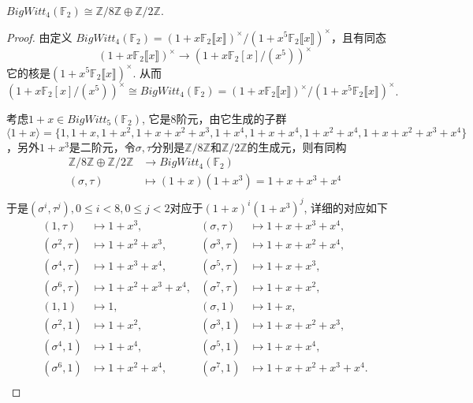 \begin{example}
	$BigWitt_4(\mathbb{F}_2) \cong \mathbb{Z}/8 \mathbb{Z} \oplus \mathbb{Z}/2 \mathbb{Z}.$
\end{example}
\begin{proof}
由定义
$BigWitt_4(\mathbb{F}_2)=(1+x \mathbb{F}_2\llbracket x\rrbracket )^{\times}/(1+x^5 \mathbb{F}_2\llbracket x\rrbracket )^{\times}$，且有同态
\[(1+x \mathbb{F}_2\llbracket x\rrbracket )^{\times} \longrightarrow (1+x \mathbb{F}_2[x]/(x^5))^{\times}\]
它的核是$(1+x^5 \mathbb{F}_2\llbracket x\rrbracket )^{\times}$.
从而$(1+x \mathbb{F}_2[x]/(x^5))^{\times} \cong BigWitt_4(\mathbb{F}_2)=(1+x \mathbb{F}_2\llbracket x\rrbracket )^{\times}/(1+x^5 \mathbb{F}_2\llbracket x\rrbracket )^{\times}$.

	考虑$1+x \in BigWitt_5(\mathbb{F}_2)$, 它是$8$阶元，由它生成的子群$\langle 1+x \rangle = \{1,1+x,1+x^2,1+x+x^2+x^3,1+x^4,1+x+x^4,1+x^2+x^4,1+x+x^2+x^3+x^4\}$，另外$1+x^3$是二阶元，令$\sigma,\tau$分别是$\mathbb{Z}/8 \mathbb{Z}$和$\mathbb{Z}/2 \mathbb{Z}$的生成元，则有同构
	\begin{align*}
	\mathbb{Z}/8 \mathbb{Z} \oplus \mathbb{Z}/2 \mathbb{Z} &\longrightarrow BigWitt_4(\mathbb{F}_2) \\
	(\sigma,\tau) & \mapsto (1+x)(1+x^3)=1+x+x^3+x^4 \\
	\end{align*}
	于是$(\sigma^i,\tau^j), 0\leq i <8, 0\leq j<2$对应于$(1+x)^i(1+x^3)^j$, 详细的对应如下
	\begin{align*}
	(1,\tau) & \mapsto 1+x^3,& (\sigma,\tau) & \mapsto 1+x+x^3+x^4, \\
	 (\sigma^2,\tau) & \mapsto 1+x^2+x^3,& (\sigma^3,\tau) & \mapsto 1+x+x^2+x^4, \\
	(\sigma^4,\tau) & \mapsto 1+x^3+x^4, & (\sigma^5,\tau) & \mapsto 1+x+x^3, \\
	 (\sigma^6,\tau) & \mapsto 1+x^2+x^3+x^4, & (\sigma^7,\tau) & \mapsto 1+x+x^2, \\
	(1,1)& \mapsto 1,& (\sigma,1) & \mapsto 1+x, \\
	(\sigma^2,1) & \mapsto 1+x^2, & (\sigma^3,1) & \mapsto 1+x+x^2+x^3, \\
	(\sigma^4,1) & \mapsto 1+x^4, &
	(\sigma^5,1) & \mapsto 1+x+x^4, \\
	(\sigma^6,1) & \mapsto 1+x^2+x^4, & (\sigma^7,1) & \mapsto 1+x+x^2+x^3+x^4. \\
	\end{align*}

\end{proof}



